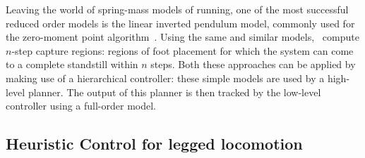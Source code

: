 Leaving the world of spring-mass models of running, one of the most successful reduced order models is the linear inverted pendulum  model, commonly used for the zero-moment point algorithm~\cite{kajita2001LIP,kajita2003ZMP}. Using the same and similar models,~\textcite{koolen2012capturability} compute $n$-step capture regions: regions of foot placement for which the system can come to a complete standstill within $n$ steps. Both these approaches can be applied by making use of a hierarchical controller: these simple models are used by a high-level planner. The output of this planner is then tracked by the low-level controller using a full-order model.



\subsection{Heuristic Control for legged locomotion}



